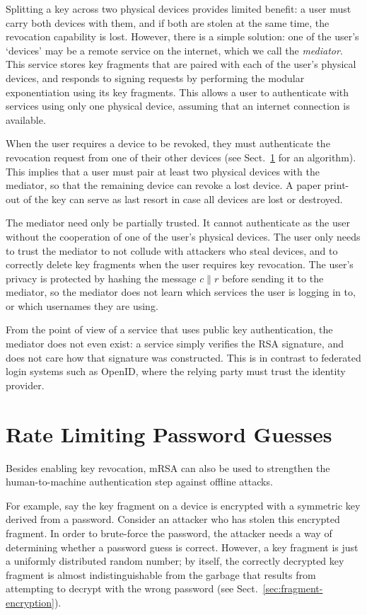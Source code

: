\documentclass{llncs}
\newcommand*{\concat}{\mathbin{\|}}
\begin{document}
Splitting a key across two physical devices provides limited benefit: a user must carry both devices
with them, and if both are stolen at the same time, the revocation capability is lost. However,
there is a simple solution: one of the user's `devices' may be a remote service on the internet,
which we call the \emph{mediator}. This service stores key fragments that are paired with each of
the user's physical devices, and responds to signing requests by performing the modular
exponentiation using its key fragments. This allows a user to authenticate with services using only
one physical device, assuming that an internet connection is available.

When the user requires a device to be revoked, they must authenticate the revocation request from
one of their other devices (see Sect.~\ref{sec:ratelimit} for an algorithm). This implies that a
user must pair at least two physical devices with the mediator, so that the remaining device can
revoke a lost device. A paper print-out of the key can serve as last resort in case all devices are
lost or destroyed.

The mediator need only be partially trusted. It cannot authenticate as the user without the
cooperation of one of the user's physical devices. The user only needs to trust the mediator to not
collude with attackers who steal devices, and to correctly delete key fragments when the user
requires key revocation. The user's privacy is protected by hashing the message
$c \concat r$ before sending it to the mediator, so the mediator does not learn which
services the user is logging in to, or which usernames they are using.

From the point of view of a service that uses public key authentication, the mediator does not even
exist: a service simply verifies the RSA signature, and does not care how that
signature was constructed. This is in contrast to federated login systems such as OpenID, where the
relying party must trust the identity provider.

\section{Rate Limiting Password Guesses}\label{sec:ratelimit}

Besides enabling key revocation, mRSA can also be used to strengthen the human-to-machine
authentication step against offline attacks.

For example, say the key fragment on a device is encrypted with a symmetric key derived from a
password. Consider an attacker who has stolen this encrypted fragment. In order to brute-force the
password, the attacker needs a way of determining whether a password guess is correct. However, a
key fragment is just a uniformly distributed random number; by itself, the correctly decrypted key
fragment is almost indistinguishable from the garbage that results from attempting to decrypt with
the wrong password (see Sect.~\ref{sec:fragment-encryption}).
\end{document}
